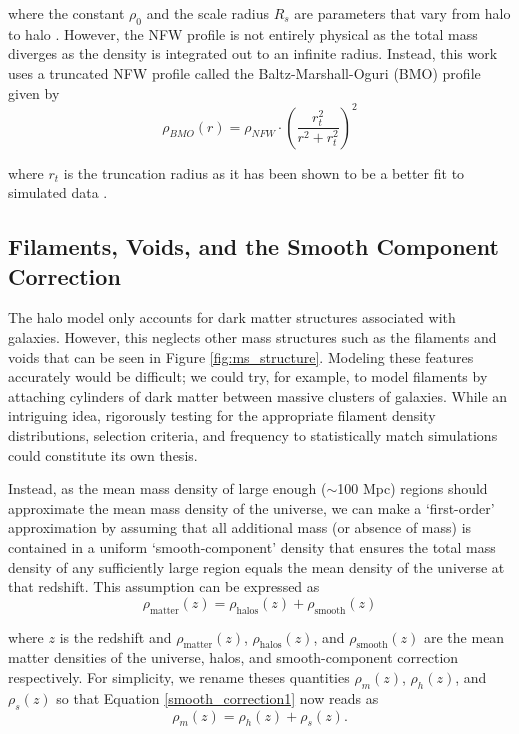 \documentclass[%
 reprint,
 amsmath,amssymb,
 aps,nofootinbib
]{revtex4-1}
\begin{document}
\noindent where the constant $\rho_0$ and the scale radius $R_s$ are parameters that vary from halo to halo \cite{nfw}. However, the NFW profile is not entirely physical as the total mass diverges as the density is integrated out to an infinite radius. Instead, this work uses a truncated NFW profile called the Baltz-Marshall-Oguri (BMO) profile given by
\begin{equation}\label{bmo_profile}
\rho_{BMO}(r)=\rho_{NFW}\cdot\left(\frac{r_t^2}{r^2+r_t^2}\right)^2
\end{equation}

\noindent where $r_t$ is the truncation radius as it has been shown to be a better fit to simulated data \cite{nfw_bmo}.


\subsection{Filaments, Voids, and the Smooth Component Correction}\label{scc}

The halo model only accounts for dark matter structures associated with galaxies. However, this neglects other mass structures such as the filaments and voids that can be seen in Figure \ref{fig:ms_structure}. Modeling these features accurately would be difficult; we could try, for example, to model filaments by attaching cylinders of dark matter between massive clusters of galaxies. While an intriguing idea, rigorously testing for the appropriate filament density distributions, selection criteria, and frequency to statistically match simulations could constitute its own thesis.

Instead, as the mean mass density of large enough ($\sim$100 Mpc) regions should approximate the mean mass density of the universe, we can make a `first-order' approximation by assuming that all additional mass (or absence of mass) is contained in a uniform `smooth-component' density that ensures the total mass density of any sufficiently large region equals the mean density of the universe at that redshift. This assumption can be expressed as
\begin{equation}\label{smooth_correction1}
\rho_{\text{matter}}(z)=\rho_{\text{halos}}(z)+\rho_{\text{smooth}}(z)
\end{equation}

\noindent where $z$ is the redshift and $\rho_{\text{matter}}(z)$, $\rho_{\text{halos}}(z)$, and $\rho_{\text{smooth}}(z)$ are the mean matter densities of the universe, halos, and smooth-component correction respectively. For simplicity, we rename theses quantities ${\rho_m(z)}$, ${\rho_h(z)}$, and ${\rho_s(z)}$ so that Equation \eqref{smooth_correction1} now reads as
\begin{equation}\label{smooth_correction2}
\rho_m(z)=\rho_h(z)+\rho_s(z).
\end{equation}
\end{document}
